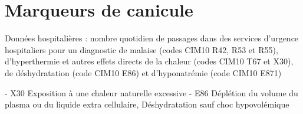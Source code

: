 \documentclass[12pt,english,french,twoside]{book}\usepackage[]{graphicx}\usepackage[]{color}
\begin{document}
\section{Marqueurs de canicule}

Données hospitalières : nombre quotidien de passages dans des services d'urgence hospitaliers pour un diagnostic de malaise (codes CIM10 R42, R53 et R55), d'hyperthermie et autres effets directs de la chaleur (codes CIM10 T67 et X30), de déshydratation (code CIM10 E86) et d'hyponatrémie (code CIM10 E871)

- X30  Exposition à une chaleur naturelle excessive
- E86  Déplétion du volume du plasma ou du liquide extra cellulaire, Déshydratation sauf choc hypovolémique
\end{document}
